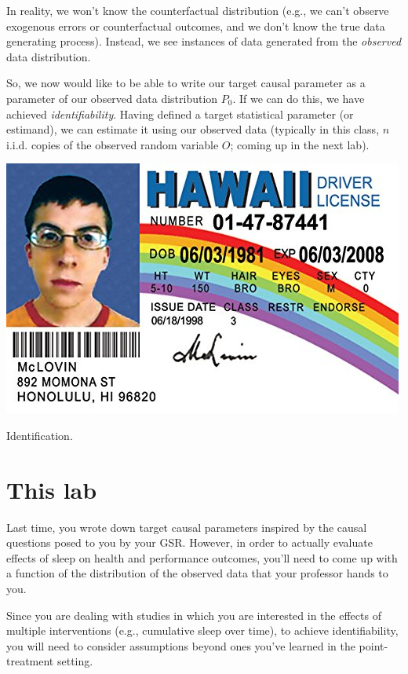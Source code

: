 \documentclass[answers]{exam}
\newenvironment{myfigure}{\captionsetup{type=mytype}}{}
\begin{document}
\noindent In reality, we won't know the counterfactual distribution (e.g., we can't observe exogenous errors or counterfactual outcomes, and we don't know the true data generating process). Instead, we see instances of data generated from the \textit{observed} data distribution.

\noindent So, we now would like to be able to write our target causal parameter as a parameter of our observed data distribution $P_0$. If we can do this, we have achieved \textit{identifiability}. Having defined a target statistical parameter (or estimand), we can estimate it using our observed data (typically in this class, $n$ i.i.d. copies of the observed random variable $O$; coming up in the next lab).

\begin{myfigure}
\begin{center}
\includegraphics[width=.3\textwidth]{identification.jpg}
\caption{Identification.}
\end{center}
\end{myfigure}

\section{This lab}

Last time, you wrote down target causal parameters inspired by the causal questions posed to you by your GSR. However, in order to actually evaluate effects of sleep on health and performance outcomes, you'll need to come up with a function of the distribution of the observed data that your professor hands to you. 


\noindent Since you are dealing with studies in which you are interested in the effects of multiple interventions (e.g., cumulative sleep over time), to achieve identifiability, you will need to consider assumptions beyond ones you've learned in the point-treatment setting. 
\end{document}
